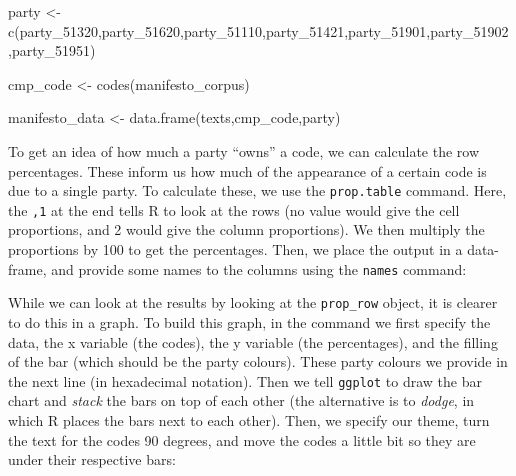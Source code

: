 \documentclass[
]{article}
\newenvironment{Shaded}{\begin{snugshade}}{\end{snugshade}}
\newcommand{\AttributeTok}[1]{\textcolor[rgb]{0.77,0.63,0.00}{#1}}
\newcommand{\DecValTok}[1]{\textcolor[rgb]{0.00,0.00,0.81}{#1}}
\newcommand{\FunctionTok}[1]{\textcolor[rgb]{0.00,0.00,0.00}{#1}}
\newcommand{\NormalTok}[1]{#1}
\newcommand{\OtherTok}[1]{\textcolor[rgb]{0.56,0.35,0.01}{#1}}
\newcommand{\SpecialCharTok}[1]{\textcolor[rgb]{0.00,0.00,0.00}{#1}}
\newcommand{\StringTok}[1]{\textcolor[rgb]{0.31,0.60,0.02}{#1}}
\begin{document}
\begin{Shaded}
\begin{Highlighting}[]
\NormalTok{party }\OtherTok{\textless{}{-}} \FunctionTok{c}\NormalTok{(party\_51320,party\_51620,party\_51110,party\_51421,party\_51901,party\_51902,party\_51951)}

\NormalTok{cmp\_code }\OtherTok{\textless{}{-}} \FunctionTok{codes}\NormalTok{(manifesto\_corpus)}

\NormalTok{manifesto\_data }\OtherTok{\textless{}{-}} \FunctionTok{data.frame}\NormalTok{(texts,cmp\_code,party)}
\end{Highlighting}
\end{Shaded}

To get an idea of how much a party ``owns'' a code, we can calculate the row percentages. These inform us how much of the appearance of a certain code is due to a single party. To calculate these, we use the \texttt{prop.table} command. Here, the \texttt{,1} at the end tells R to look at the rows (no value would give the cell proportions, and 2 would give the column proportions). We then multiply the proportions by 100 to get the percentages. Then, we place the output in a data-frame, and provide some names to the columns using the \texttt{names} command:

\begin{Shaded}
\end{Shaded}

While we can look at the results by looking at the \texttt{prop\_row} object, it is clearer to do this in a graph. To build this graph, in the command we first specify the data, the x variable (the codes), the y variable (the percentages), and the filling of the bar (which should be the party colours). These party colours we provide in the next line (in hexadecimal notation). Then we tell \texttt{ggplot} to draw the bar chart and \emph{stack} the bars on top of each other (the alternative is to \emph{dodge}, in which R places the bars next to each other). Then, we specify our theme, turn the text for the codes 90 degrees, and move the codes a little bit so they are under their respective bars:
\end{document}
